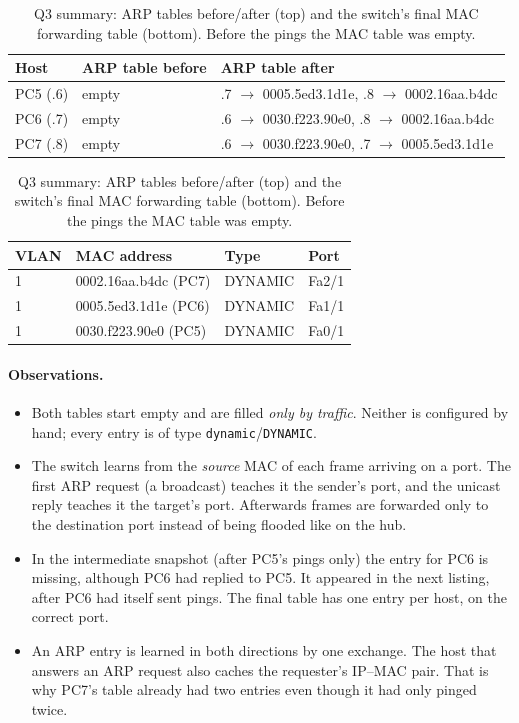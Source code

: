 \documentclass[11pt]{article}
\begin{document}
\begin{table}[H]
\centering
\small
\begin{tabular}{lll}
\toprule
\textbf{Host} & \textbf{ARP table before} & \textbf{ARP table after} \\
\midrule
PC5 (.6) & empty & .7 $\to$ 0005.5ed3.1d1e,\; .8 $\to$ 0002.16aa.b4dc \\
PC6 (.7) & empty & .6 $\to$ 0030.f223.90e0,\; .8 $\to$ 0002.16aa.b4dc \\
PC7 (.8) & empty & .6 $\to$ 0030.f223.90e0,\; .7 $\to$ 0005.5ed3.1d1e \\
\bottomrule
\end{tabular}
\vspace{0.6em}

\begin{tabular}{llll}
\toprule
\textbf{VLAN} & \textbf{MAC address} & \textbf{Type} & \textbf{Port} \\
\midrule
1 & 0002.16aa.b4dc (PC7) & DYNAMIC & Fa2/1 \\
1 & 0005.5ed3.1d1e (PC6) & DYNAMIC & Fa1/1 \\
1 & 0030.f223.90e0 (PC5) & DYNAMIC & Fa0/1 \\
\bottomrule
\end{tabular}
\caption{Q3 summary: ARP tables before/after (top) and the switch's final MAC forwarding
table (bottom). Before the pings the MAC table was empty.}
\end{table}

\paragraph{Observations.}
\begin{itemize}[leftmargin=1.6em]
  \item Both tables start empty and are filled \emph{only by traffic}. Neither is configured
  by hand; every entry is of type \texttt{dynamic}/\texttt{DYNAMIC}.
  \item The switch learns from the \emph{source} MAC of each frame arriving on a port. The
  first ARP request (a broadcast) teaches it the sender's port, and the unicast reply teaches
  it the target's port. Afterwards frames are forwarded only to the destination port instead
  of being flooded like on the hub.
  \item In the intermediate snapshot (after PC5's pings only) the entry for PC6 is missing,
  although PC6 had replied to PC5. It appeared in the next listing, after PC6 had itself
  sent pings. The final table has one entry per host, on the correct port.
  \item An ARP entry is learned in both directions by one exchange. The host that answers
  an ARP request also caches the requester's IP--MAC pair. That is why PC7's table already
  had two entries even though it had only pinged twice.
\end{itemize}
\end{document}
